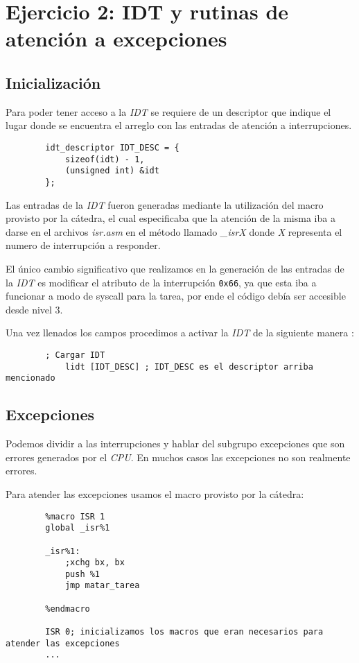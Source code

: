 \section{Ejercicio 2: IDT y rutinas de atención a excepciones}

	\subsection{Inicialización}

	Para poder tener acceso a la \textit{IDT} se requiere de un descriptor que indique el lugar donde se encuentra el arreglo con las entradas de atención a interrupciones. 

	\begin{lstlisting}
		idt_descriptor IDT_DESC = {
	    	sizeof(idt) - 1,
	    	(unsigned int) &idt
		};
	\end{lstlisting}

	Las entradas de la \textit{IDT} fueron generadas mediante la utilización del macro provisto por la cátedra, el cual especificaba que la atención de la misma iba a darse en el archivos \textit{isr.asm} en el método llamado \textit{\_isrX} donde \textit{X} representa el numero de interrupción a responder. 

	El único cambio significativo que realizamos en la generación de las entradas de la \textit{IDT} es modificar el atributo de la interrupción \texttt{0x66}, ya que esta iba a funcionar a modo de syscall para la tarea, por ende el código debía ser accesible desde nivel 3. 

	Una vez llenados los campos procedimos a activar la \textit{IDT} de la siguiente manera :

	\begin{lstlisting}
   		; Cargar IDT
    		lidt [IDT_DESC] ; IDT_DESC es el descriptor arriba mencionado
	\end{lstlisting}

	\subsection{Excepciones}

	Podemos dividir a las interrupciones y hablar del subgrupo excepciones que son errores generados por el \textit{CPU}. En muchos casos las excepciones no son realmente errores.

	Para atender las excepciones usamos el macro provisto por la cátedra:

	\begin{lstlisting}
   		%macro ISR 1
		global _isr%1

		_isr%1:
		    ;xchg bx, bx
		    push %1
		    jmp matar_tarea

		%endmacro

		ISR 0; inicializamos los macros que eran necesarios para atender las excepciones
		...
	\end{lstlisting}

